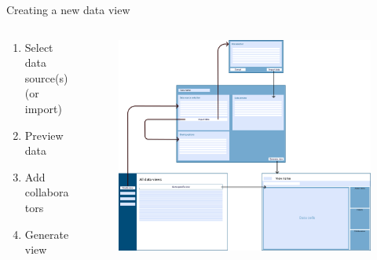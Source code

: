 \documentclass[aspectratio=169]{beamer}
\begin{document}
\begin{frame}{Creating a new data view}
    \begin{columns}
        \begin{column}{0.4\textwidth}
            \begin{enumerate}
                \footnotesize
                \item Select data source(s) (or import)
                \item Preview data 
                \item Add collaborators
                \item Generate view
            \end{enumerate}
        \end{column}
        \begin{column}{0.6\textwidth}
            \begin{figure}[h]
                \vspace{-2em}
                \centering
                \includegraphics[width=1.1\textwidth]{images/generate-view-flow.png}
            \end{figure}
        \end{column}
    \end{columns}
\end{frame}

\end{document}
